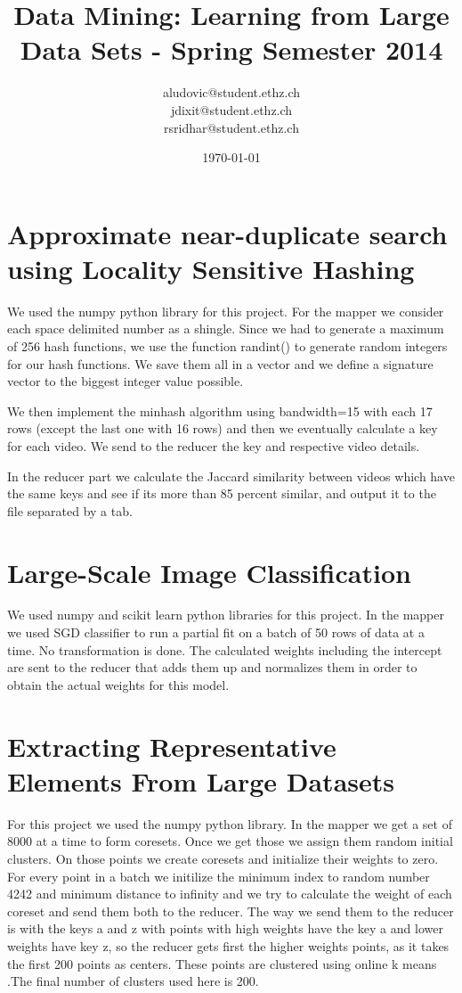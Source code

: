 \documentclass[a4paper, 11pt]{article}
\title{Data Mining: Learning from Large Data Sets - Spring Semester 2014}
\author{aludovic@student.ethz.ch\\ jdixit@student.ethz.ch\\ rsridhar@student.ethz.ch\\}
\date{\today}
\begin{document}
\maketitle

\section{Approximate near-duplicate search using Locality Sensitive Hashing} 

We used the numpy python library for this project. For the mapper we consider each space delimited number as a shingle. Since we had to generate a maximum
of 256 hash functions, we use the function randint() to generate random integers for our hash functions. We save them all in a vector and we define a signature
vector to the biggest integer value possible.

We then implement the minhash algorithm using bandwidth=15 with each 17 rows (except the last one with 16 rows) and then we eventually calculate a key for
each video. We send to the reducer the key and respective video details.

In the reducer part we calculate the Jaccard similarity between videos which have the same keys and see if its more than 85 percent similar, and output
it to the file separated by a tab.

\section{Large-Scale Image Classification}

We used numpy and scikit learn python libraries for this project. In the mapper we used SGD classifier to run a partial fit on a batch of 50 rows of data
at a time. No transformation is done. The calculated weights including the intercept are sent to the reducer that adds them up and normalizes them in order
to obtain the actual weights for this model.

\section{Extracting Representative Elements From Large Datasets}

For this project we used the numpy python library. In the mapper we get a set of 8000 at a time to form coresets. Once we get those
we assign them random initial clusters. On those points we create coresets and initialize their weights to zero. For every point
in a batch we initilize the minimum index to random number 4242 and minimum distance to infinity and we try to calculate the weight of each coreset
and send them both to the reducer. The way we send them to the reducer is with the keys a and z with points with high weights have
the key a and lower weights have key z, so the reducer gets first the higher weights points, as it takes the first 200 points as centers.
These points are clustered using online k means .The final number of clusters used here is 200.
\end{document}
